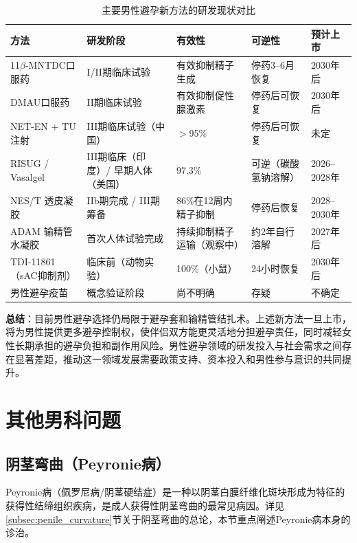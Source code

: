 \documentclass[12pt,a4paper,twoside]{ctexbook}
\begin{document}
\begin{table}[htbp]
\centering
\caption{主要男性避孕新方法的研发现状对比}
\label{tab:male_contraception_new}
\begin{tabularx}{\textwidth}{@{}lXXXX@{}}
    \toprule
    \textbf{方法} & \textbf{研发阶段} & \textbf{有效性} & \textbf{可逆性} & \textbf{预计上市} \\
    \midrule
    11$\beta$-MNTDC口服药 & I/II期临床试验 & 有效抑制精子生成 & 停药3--6月恢复 & 2030年后 \\
    DMAU口服药 & II期临床试验 & 有效抑制促性腺激素 & 停药后可恢复 & 2030年后 \\
    NET-EN + TU注射 & III期临床试验（中国） & $>$95\% & 停药后可恢复 & 未定 \\
    RISUG / Vasalgel & III期临床（印度）/ 早期人体（美国） & 97.3\% & 可逆（碳酸氢钠溶解） & 2026--2028年 \\
    NES/T 透皮凝胶 & IIb期完成 / III期筹备 & 86\%在12周内精子抑制 & 停药后恢复 & 2028--2030年 \\
    ADAM 输精管水凝胶 & 首次人体试验完成 & 持续抑制精子运输（观察中） & 约2年自行溶解 & 2027年后 \\
    TDI-11861（sAC抑制剂） & 临床前（动物实验） & 100\%（小鼠） & 24小时恢复 & 2030年后 \\
    男性避孕疫苗 & 概念验证阶段 & 尚不明确 & 存疑 & 不确定 \\
    \bottomrule
\end{tabularx}
\end{table}

\noindent\textbf{总结}：目前男性避孕选择仍局限于避孕套和输精管结扎术。上述新方法一旦上市，将为男性提供更多避孕控制权，使伴侣双方能更灵活地分担避孕责任，同时减轻女性长期承担的避孕负担和副作用风险。男性避孕领域的研发投入与社会需求之间存在显著差距，推动这一领域发展需要政策支持、资本投入和男性参与意识的共同提升。


\section{其他男科问题}


\subsection{阴茎弯曲（Peyronie病）}
\label{subsec:peyronie}

Peyronie病（佩罗尼病/阴茎硬结症）是一种以阴茎白膜纤维化斑块形成为特征的获得性结缔组织疾病，是成人获得性阴茎弯曲的最常见病因。详见\ref{subsec:penile_curvature}节关于阴茎弯曲的总论，本节重点阐述Peyronie病本身的诊治。
\end{document}
